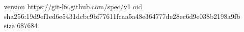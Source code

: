 version https://git-lfs.github.com/spec/v1
oid sha256:19d9ef1ed6e5431dcbc9bf77611fcaa5a48e364777de28ec6d9e038b2198a9fb
size 687684
